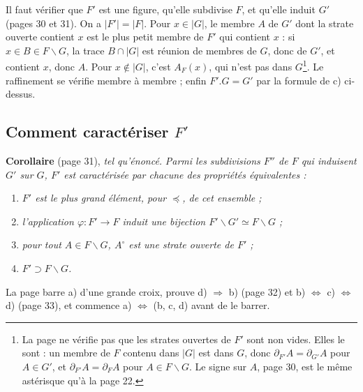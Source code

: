\documentclass[11pt,a4paper]{article}
\begin{document}
Il faut vérifier que $F'$ est une figure, qu'elle subdivise $F$, et qu'elle
induit $G'$ (pages 30 et 31). On a $|F'| = |F|$. Pour $x \in |G|$, le membre
$A$ de $G'$ dont la strate ouverte contient $x$ est le plus petit membre de $F'$
qui contient $x$ : si $x \in B \in F \smallsetminus G$, la trace $B \cap |G|$
est réunion de membres de $G$, donc de $G'$, et contient $x$, donc $A$. Pour $x
\notin |G|$, c'est $A_{F}(x)$, qui n'est pas dans $G$\footnote{La page ne
vérifie pas que les strates ouvertes de $F'$ sont non vides. Elles le sont : un
membre de $F$ contenu dans $|G|$ est dans $G$, donc $\partial_{F'} A =
\partial_{G'} A$ pour $A \in G'$, et $\partial_{F'} A = \partial_{F} A$ pour $A
\in F \smallsetminus G$. Le signe sur $A$, page 30, est le même astérisque qu'à
la page 22.}. Le raffinement se vérifie membre à membre ; enfin $F'.G = G'$ par
la formule de c) ci-dessus.

\subsection*{Comment caractériser $F'$}

\textbf{Corollaire} (page 31), \emph{tel qu'énoncé.} \emph{Parmi les
subdivisions $F''$ de $F$ qui induisent $G'$ sur $G$, $F'$ est caractérisée
par chacune des propriétés équivalentes :}
\begin{enumerate}
\item[a)] \emph{$F'$ est le plus grand élément, pour $\preccurlyeq$, de cet
ensemble ;}
\item[b)] \emph{l'application $\varphi : F' \to F$ induit une bijection $F'
\smallsetminus G' \simeq F \smallsetminus G$ ;}
\item[c)] \emph{pour tout $A \in F \smallsetminus G$, $A^{\circ}$ est une strate
ouverte de $F'$ ;}
\item[d)] \emph{$F' \supset F \smallsetminus G$.}
\end{enumerate}

La page barre a) d'une grande croix, prouve d) $\Rightarrow$ b) (page 32) et b)
$\Leftrightarrow$ c) $\Leftrightarrow$ d) (page 33), et commence a)
$\Leftrightarrow$ (b, c, d) avant de le barrer.
\end{document}

